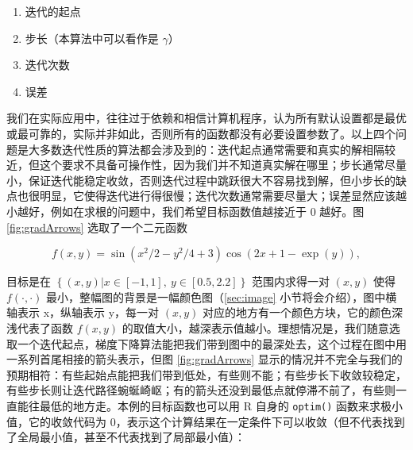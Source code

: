 \documentclass[
  b5paper,
  UTF8,twoside]{book}
\providecommand{\tightlist}{%
  \setlength{\itemsep}{0pt}\setlength{\parskip}{0pt}}
\begin{document}
\begin{enumerate}
\def\labelenumi{\arabic{enumi}.}
\tightlist
\item
  迭代的起点
\item
  步长（本算法中可以看作是 \(\gamma\)）
\item
  迭代次数
\item
  误差
\end{enumerate}

我们在实际应用中，往往过于依赖和相信计算机程序，认为所有默认设置都是最优或最可靠的，实际并非如此，否则所有的函数都没有必要设置参数了。以上四个问题是大多数迭代性质的算法都会涉及到的：迭代起点通常需要和真实的解相隔较近，但这个要求不具备可操作性，因为我们并不知道真实解在哪里；步长通常尽量小，保证迭代能稳定收敛，否则迭代过程中跳跃很大不容易找到解，但小步长的缺点也很明显，它使得迭代进行得很慢；迭代次数通常需要尽量大；误差显然应该越小越好，例如在求根的问题中，我们希望目标函数值越接近于 0 越好。图 \ref{fig:gradArrows} 选取了一个二元函数

\[f(x,y)=\sin(x^{2}/2-y^{2}/4+3)\cos(2x+1-\exp(y)),\]

目标是在 \(\left\{ (x,y)|x\in[-1,1],\ y\in[0.5,2.2]\right\}\) 范围内求得一对 \((x,y)\) 使得 \(f(\cdot,\cdot)\) 最小，整幅图的背景是一幅颜色图（\ref{sec:image} 小节将会介绍），图中横轴表示 x，纵轴表示 y，每一对 \((x,y)\) 对应的地方有一个颜色方块，它的颜色深浅代表了函数 \(f(x,y)\) 的取值大小，越深表示值越小。理想情况是，我们随意选取一个迭代起点，梯度下降算法能把我们带到图中的最深处去，这个过程在图中用一系列首尾相接的箭头表示，但图 \ref{fig:gradArrows} 显示的情况并不完全与我们的预期相符：有些起始点能把我们带到低处，有些则不能；有些步长下收敛较稳定，有些步长则让迭代路径蜿蜒崎岖；有的箭头还没到最低点就停滞不前了，有些则一直能往最低的地方走。本例的目标函数也可以用 R 自身的 \texttt{optim()} 函数来求极小值，它的收敛代码为 0，表示这个计算结果在一定条件下可以收敛（但不代表找到了全局最小值，甚至不代表找到了局部最小值）：
\end{document}
